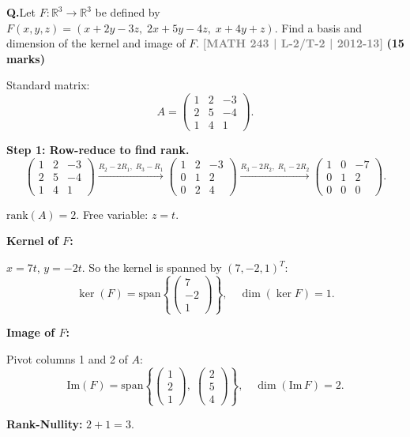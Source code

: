 \documentclass[12pt,a3paper]{article}
\newcommand{\yr}[1]{\hfill\textcolor{gray}{\small\textbf{[#1]}}}
\newcommand{\mk}[1]{\textcolor{orange!70!black}{\small\textbf{(#1 marks)}}}
\newcounter{qnum}
\newcommand{\Q}[1]{%
  \needspace{4\baselineskip}
  \refstepcounter{qnum}
  \vspace{6pt}
  \noindent\textbf{Q\theqnum.}\enspace #1\par
}
\begin{document}
\Q{Let $F: \mathbb{R}^3 \to \mathbb{R}^3$ be defined by $F(x,y,z) = (x+2y-3z,\; 2x+5y-4z,\; x+4y+z)$. Find a basis and dimension of the kernel and image of $F$.
\yr{MATH 243 | L-2/T-2 | 2012-13} \mk{15}}

\begin{tcolorbox}[enhanced,breakable,
  colback=cF!4,colframe=cF,boxrule=0.8pt,arc=5pt,
  title={\textbf{Answer --- $F:\mathbb{R}^3\to\mathbb{R}^3$, $F(x,y,z)=(x+2y-3z,\;2x+5y-4z,\;x+4y+z)$: Kernel \& Image}},
  fonttitle=\bfseries\color{white},colbacktitle=cF]

Standard matrix:
\[
A=\begin{pmatrix}1&2&-3\\2&5&-4\\1&4&1\end{pmatrix}.
\]

\textbf{Step 1: Row-reduce to find rank.}
\[
\begin{pmatrix}1&2&-3\\2&5&-4\\1&4&1\end{pmatrix}
\xrightarrow{R_2-2R_1,\;R_3-R_1}
\begin{pmatrix}1&2&-3\\0&1&2\\0&2&4\end{pmatrix}
\xrightarrow{R_3-2R_2,\;R_1-2R_2}
\begin{pmatrix}1&0&-7\\0&1&2\\0&0&0\end{pmatrix}.
\]

$\mathrm{rank}(A)=2$. Free variable: $z=t$.

\textbf{Kernel of $F$:}

$x=7t$, $y=-2t$. So the kernel is spanned by $(7,-2,1)^T$:
\[
\boxed{\ker(F)=\mathrm{span}\!\left\{\begin{pmatrix}7\\-2\\1\end{pmatrix}\right\},\quad\dim(\ker F)=1.}
\]

\textbf{Image of $F$:}

Pivot columns 1 and 2 of $A$:
\[
\boxed{\mathrm{Im}(F)=\mathrm{span}\!\left\{\begin{pmatrix}1\\2\\1\end{pmatrix},\;\begin{pmatrix}2\\5\\4\end{pmatrix}\right\},\quad\dim(\mathrm{Im}\,F)=2.}
\]

\textbf{Rank-Nullity:} $2+1=3$. \checkmark

\end{tcolorbox}
\end{document}
